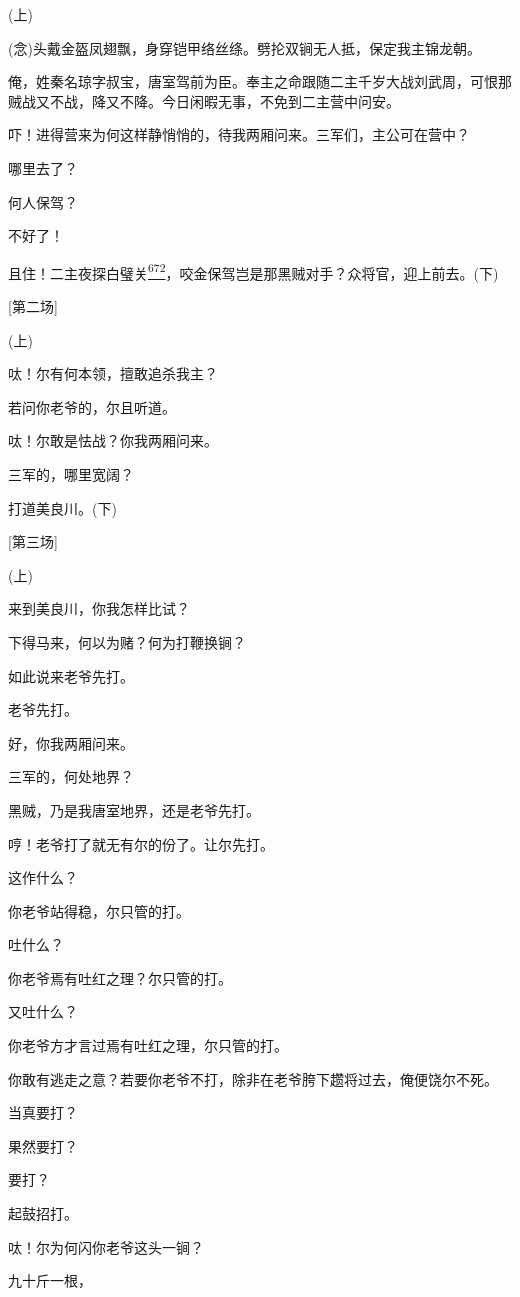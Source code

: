 (上)

(念)头戴金盔凤翅飘，身穿铠甲络丝绦。劈抡双锏无人抵，保定我主锦龙朝。

俺，姓秦名琼字叔宝，唐室驾前为臣。奉主之命跟随二主千岁大战刘武周，可恨那贼战又不战，降又不降。今日闲暇无事，不免到二主营中问安。

吓！进得营来为何这样静悄悄的，待我两厢问来。三军们，主公可在营中？

哪里去了？

何人保驾？

不好了！

且住！二主夜探白璧关\protect\hyperlink{fn672}{\textsuperscript{672}}，咬金保驾岂是那黑贼对手？众将官，迎上前去。(下)

{[}第二场{]}

(上)

呔！尔有何本领，擅敢追杀我主？

若问你老爷的，尔且听道。

呔！尔敢是怯战？你我两厢问来。

三军的，哪里宽阔？

打道美良川。(下)

{[}第三场{]}

(上)

来到美良川，你我怎样比试？

下得马来，何以为赌？何为打鞭换锏？

如此说来老爷先打。

老爷先打。

好，你我两厢问来。

三军的，何处地界？

黑贼，乃是我唐室地界，还是老爷先打。

哼！老爷打了就无有尔的份了。让尔先打。

这作什么？

你老爷站得稳，尔只管的打。

吐什么？

你老爷焉有吐红之理？尔只管的打。

又吐什么？

你老爷方才言过焉有吐红之理，尔只管的打。

你敢有逃走之意？若要你老爷不打，除非在老爷胯下趱将过去，俺便饶尔不死。

当真要打？

果然要打？

要打？

起鼓招打。

呔！尔为何闪你老爷这头一锏？

九十斤一根，

